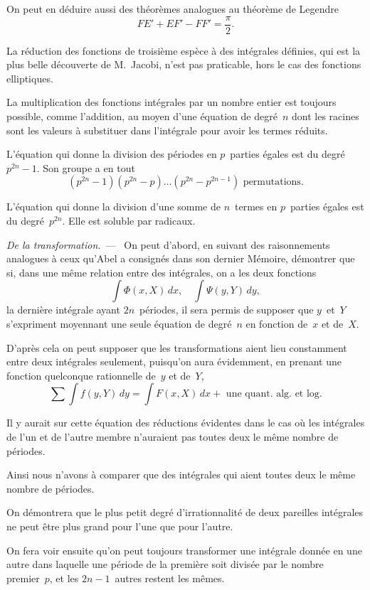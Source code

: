 \documentclass[leqno,12pt]{book}[2005/09/16]
\newcommand{\Par}[1]{\medskip\par\textit{#1}\ ---\ \ignorespaces}
\begin{document}
On peut en déduire aussi des théorèmes analogues au théorème
de Legendre
\[
FE' + EF' - FF' = \frac{\pi}{2}.
\]

La réduction des fonctions de troisième espèce à des intégrales
définies, qui est la plus belle découverte de M.~Jacobi, n'est pas
praticable, hors le cas des fonctions elliptiques.

La multiplication des fonctions intégrales par un nombre entier
est toujours possible, comme l'addition, au moyen d'une équation
de degré~$n$ dont les racines sont les valeurs à substituer dans
l'intégrale pour avoir les termes réduits.

L'équation qui donne la division des périodes en $p$~parties
égales est du degré~$p^{2n} - 1$. Son groupe a en tout
\[
(p^{2n} - 1)(p^{2n} - p) \dots (p^{2n} - p^{2n-1}) \text{ permutations}.
\]

L'équation qui donne la division d'une somme de $n$~termes
en $p$~parties égales est du degré~$p^{2n}$. Elle est soluble par radicaux.

\Par{De la transformation.} On peut d'abord, en suivant des raisonnements
analogues à ceux qu'Abel a consignés dans son dernier
Mémoire, démontrer que si, dans une même relation entre
des intégrales, on a les deux fonctions
\[
\int \Phi(x, X)\, dx, \quad
\int \Psi(y, Y)\, dy,
\]
la dernière intégrale ayant $2n$~périodes, il sera permis de supposer
que $y$~et~$Y$ s'expriment moyennant une seule équation de
degré~$n$ en fonction de~$x$ et de~$X$.

D'après cela on peut supposer que les transformations aient
lieu constamment entre deux intégrales seulement, puisqu'on
aura évidemment, en prenant une fonction quelconque rationnelle
de~$y$ et de~$Y$,
\[
{\textstyle\sum} \int f(y, Y)\, dy
  = \int F(x, X)\, dx + \text{ une quant.\ alg.\ et log.}
\]

Il y aurait sur cette équation des réductions évidentes dans le
cas où les intégrales de l'un et de l'autre membre n'auraient pas
toutes deux le même nombre de périodes.

Ainsi nous n'avons à comparer que des intégrales qui aient
toutes deux le même nombre de périodes.

On démontrera que le plus petit degré d'irrationnalité de deux
pareilles intégrales ne peut être plus grand pour l'une que pour
l'autre.

On fera voir ensuite qu'on peut toujours transformer une intégrale
donnée en une autre dans laquelle une période de la première
soit divisée par le nombre premier~$p$, et les $2n - 1$~autres
restent les mêmes.
\end{document}
